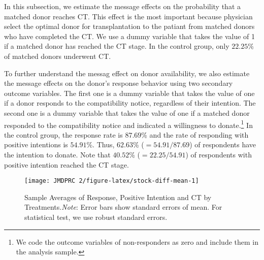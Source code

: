 \documentclass[12pt, a4paper]{article}
\begin{document}
In this subsection, we estimate the message effects on the probability that a matched donor reaches CT. This effect is the most important because physician select the optimal donor for transplantation to the patiant from matched donors who have completed the CT. We use a dummy variable that takes the value of 1 if a matched donor has reached the CT stage. In the control group, only \(22.25\)\% of matched donors underwent CT.

To further understand the messag effect on donor availability, we also estimate the message effects on the donor's response behavior using two secondary outcome variables. The first one is a dummy variable that takes the value of one if a donor responds to the compatibility notice, regardless of their intention. The second one is a dummy variable that takes the value of one if a matched donor responded to the compatibility notice and indicated a willingness to donate.\footnote{We code the outcome variables of non-responders as zero and include them in the analysis sample.} In the control group, the response rate is \(87.69\)\% and the rate of responding with positive intentions is \(54.91\)\%. Thus, \(62.63\)\% (\(=54.91/87.69\)) of respondents have the intention to donate. Note that \(40.52\)\% (\(=22.25/54.91\)) of respondents with positive intention reached the CT stage.

\begin{figure}[t]
\texttt{[image: JMDPRC~2/figure-latex/stock-diff-mean-1]} \caption{Sample Averages of Response, Positive Intention and CT by Treatments.\newline \emph{Note}: Error bars show standard errors of mean. For statistical test, we use robust standard errors.}\label{fig:stock-diff-mean}
\end{figure}
\end{document}
